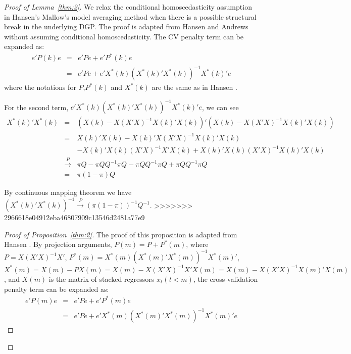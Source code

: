 \begin{proof}[Proof of Lemma~\ref{thm:2}]
We relax the conditional homoscedasticity assumption in Hansen's Mallow's model averaging method when there is a possible structural break in the underlying DGP. The proof is adapted from Hansen \cite{hansen2009averaging} and Andrews \cite{andrews93} without assuming conditional homoscedasticity. The CV penalty term can be expanded as:
\begin{eqnarray*}
e'P(k)e & = & e'Pe + e'P^{*}(k)e \\
        & = & e'Pe + e'X^{*}(k)(X^{*}(k)'X^{*}(k))^{-1}X^{*}(k)'e
\end{eqnarray*}
where the notations for $P$,$P^{*}(k)$ and $X^{*}(k)$ are the same as in Hansen \cite{hansen2009averaging}.

For the second term, $e'X^{*}(k)(X^{*}(k)'X^{*}(k))^{-1}X^{*}(k)'e$, we can see
\begin{eqnarray*}
X^{*}(k)'X^{*}(k) & = & (X(k)-X(X'X)^{-1}X(k)'X(k))'(X(k)-X(X'X)^{-1}X(k)'X(k)) \\
                  & = & X(k)'X(k) - X(k)'X(X'X)^{-1}X(k)'X(k) \\
				  &   & - X(k)'X(k)(X'X)^{-1}X'X(k) + X(k)'X(k)(X'X)^{-1}X(k)'X(k) \\
				  & \stackrel{P}{\rightarrow} & \pi Q - \pi QQ^{-1} \pi Q - \pi QQ^{-1} \pi Q + \pi QQ^{-1} \pi Q \\
				  & = & \pi (1-\pi)Q
\end{eqnarray*}

By continuous mapping theorem we have $(X^{*}(k)'X^{*}(k))^{-1}\stackrel{P}{\rightarrow}(\pi (1-\pi))^{-1}Q^{-1}$.
>>>>>>> 2966618e04912eba46807909c13546d2481a77e9

\begin{proof}[Proof of Proposition~\ref{thm:2}]
The proof of this proposition is adapted from Hansen \cite{hansen2009averaging}. By projection arguments, $P(m) = P + P^{*}(m)$, where $P = X(X'X)^{-1}X'$, $P^{*}(m) = X^{*}(m)(X^{*}(m)'X^{*}(m))^{-1}X^{*}(m)'$, $X^{*}(m) = X(m) - PX(m) = X(m) - X(X'X)^{-1}X'X(m) = X(m) - X(X'X)^{-1}X(m)'X(m)$, and $X(m)$ is the matrix of stacked regressors $x_{t}(t < m)$, the cross-validation penalty term can be expanded as:
    \begin{eqnarray*}
    e'P(m)e & = & e'Pe + e'P^{*}(m)e \\
            & = & e'Pe + e'X^{*}(m)(X^{*}(m)'X^{*}(m))^{-1}X^{*}(m)'e
    \end{eqnarray*}


\end{proof}
\end{proof}
